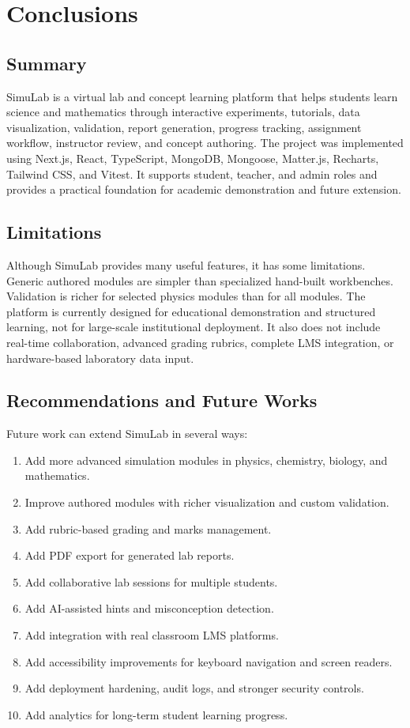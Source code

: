 \documentclass[12pt,a4paper]{report}
\begin{document}
\chapter{Conclusions}

\section{Summary}
SimuLab is a virtual lab and concept learning platform that helps students learn science and mathematics through interactive experiments, tutorials, data visualization, validation, report generation, progress tracking, assignment workflow, instructor review, and concept authoring. The project was implemented using Next.js, React, TypeScript, MongoDB, Mongoose, Matter.js, Recharts, Tailwind CSS, and Vitest. It supports student, teacher, and admin roles and provides a practical foundation for academic demonstration and future extension.

\section{Limitations}
Although SimuLab provides many useful features, it has some limitations. Generic authored modules are simpler than specialized hand-built workbenches. Validation is richer for selected physics modules than for all modules. The platform is currently designed for educational demonstration and structured learning, not for large-scale institutional deployment. It also does not include real-time collaboration, advanced grading rubrics, complete LMS integration, or hardware-based laboratory data input.

\section{Recommendations and Future Works}
Future work can extend SimuLab in several ways:

\begin{enumerate}[label=\arabic*.]
\item Add more advanced simulation modules in physics, chemistry, biology, and mathematics.
\item Improve authored modules with richer visualization and custom validation.
\item Add rubric-based grading and marks management.
\item Add PDF export for generated lab reports.
\item Add collaborative lab sessions for multiple students.
\item Add AI-assisted hints and misconception detection.
\item Add integration with real classroom LMS platforms.
\item Add accessibility improvements for keyboard navigation and screen readers.
\item Add deployment hardening, audit logs, and stronger security controls.
\item Add analytics for long-term student learning progress.
\end{enumerate}
\end{document}
